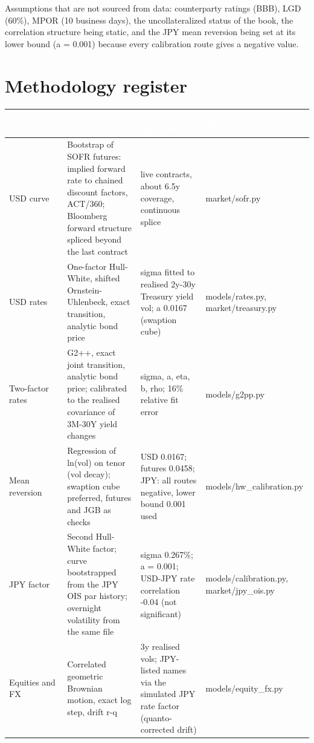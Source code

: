 \documentclass[11pt,letterpaper]{article}
\begin{document}
Assumptions that are not sourced from data: counterparty ratings (BBB), LGD (60\%), MPOR (10 business days), the uncollateralized status of the book, the correlation structure being static, and the JPY mean reversion being set at its lower bound (a = 0.001) because every calibration route gives a negative value.

\section{Methodology register}
{\scriptsize\setlength{\LTpre}{4pt}\setlength{\LTpost}{6pt}
\begin{longtable}{>{\raggedright\arraybackslash}p{}>{\raggedright\arraybackslash}p{}>{\raggedright\arraybackslash}p{}>{\raggedright\arraybackslash}p{}}
\toprule
\rowcolor{navy}\textbf{\textcolor{white}{Component}} & \textbf{\textcolor{white}{Method}} & \textbf{\textcolor{white}{Key parameters}} & \textbf{\textcolor{white}{Where (code)}} \\
\endhead
USD curve & Bootstrap of SOFR futures: implied forward rate to chained discount factors, ACT/360; Bloomberg forward structure spliced beyond the last contract & 33 live contracts, about 6.5y coverage, continuous splice & market/sofr.py \\
\rowcolor{gray!9}USD rates & One-factor Hull-White, shifted Ornstein-Uhlenbeck, exact transition, analytic bond price & sigma fitted to realised 2y-30y Treasury yield vol; a 0.0167 (swaption cube) & models/rates.py, market/treasury.py \\
Two-factor rates & G2++, exact joint transition, analytic bond price; calibrated to the realised covariance of 3M-30Y yield changes & sigma, a, eta, b, rho; 16\% relative fit error & models/g2pp.py \\
\rowcolor{gray!9}Mean reversion & Regression of ln(vol) on tenor (vol decay); swaption cube preferred, futures and JGB as checks & USD 0.0167; futures 0.0458; JPY: all routes negative, lower bound 0.001 used & models/hw\_calibration.py \\
JPY factor & Second Hull-White factor; curve bootstrapped from the JPY OIS par history; overnight volatility from the same file & sigma 0.267\%; a = 0.001; USD-JPY rate correlation -0.04 (not significant) & models/calibration.py, market/jpy\_ois.py \\
\rowcolor{gray!9}Equities and FX & Correlated geometric Brownian motion, exact log step, drift r-q & 3y realised vols; JPY-listed names via the simulated JPY rate factor (quanto-corrected drift) & models/equity\_fx.py \\

\end{longtable}}
\end{document}
